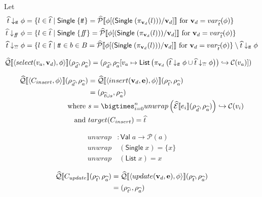 Let
\begin{align}
    \abstable \downarrow_{\true} \phi &= \{ l \in \ab{t} \mid \mathsf{Single} \; \{ \true \} = \abspredsem{\phi[(\mathsf{Single} \; (\pi_{\mathbf{v}_d}(l)))/\mathbf{v}_d]} \text{ for } \mathbf{v}_d = var_{\ab{t}}(\phi) \} \\
    \abstable \downarrow_{\false} \phi &= \{ l \in \ab{t} \mid \mathsf{Single} \; \{ \false \} = \abspredsem{\phi[(\mathsf{Single} \; (\pi_{\mathbf{v}_d}(l)))/\mathbf{v}_d]} \text{ for } \mathbf{v}_d = var_{\ab{t}}(\phi) \} \\
    \abstable \downarrow_{\unknown} \phi &= \{ l \in \ab{t} \mid \true \in b \in B = \abspredsem{\phi[(\mathsf{Single} \; (\pi_{\mathbf{v}_d}(l)))/\mathbf{v}_d]} \text{ for } \mathbf{v}_d = var_{\ab{t}}(\phi) \} \setminus \abstable \downarrow_{\true} \phi
\end{align}

\begin{align}
    \widehat{\mathcal{Q}}\llbracket \langle select(v_a, \mathbf{v}_d), \phi \rangle \rrbracket(\rho_{\widehat{d}}, \rho_{\widehat{a}})
    &= (\rho_{\widehat{d}}, \rho_{\widehat{a}}[v_a \mapsto \mathsf{List} \left( \pi_{\mathbf{v}_d} \left(\widehat{t} \downarrow_{t\!t} \phi \cup \widehat{t} \downarrow_{?\!?} \phi \right) \right) \hookrightarrow \mathcal{C}(v_a) ])
\end{align}

\begin{align}
    \abssqlsem{\langle C_{insert}, \phi \rangle}(\rho_{\ab{d}}, \rho_{\ab{a}}) & =
    \abssqlsem{\langle insert(\mathbf{v}_d, \mathbf{e}), \phi \rangle}(\rho_{\ab{t}}, \rho_{\ab{a}})\\
    & = (\rho_{\ab{t} \cup s}, \rho_{\ab{a}}) \\
    \text{where }& s = \bigtimes_{i = 0}^{n} unwrap\left( \absexpsem{e_i}(\rho_{\ab{d}}, \rho_{\ab{a}}) \right) \into \lookupcl(v_i) \\
    \text{and }& target(C_{insert}) = \ab{t}
\end{align}

\begin{align}
    unwrap &: \mathsf{Val} \; a  \rightarrow \mathcal{P}(a) \\
    unwrap &\;(\mathsf{Single} \; x) = \{x\} \\
    unwrap &\;(\mathsf{List} \; x) = x
\end{align}


\begin{align}
    \widehat{\mathcal{Q}}\llbracket C_{update} \rrbracket(\rho_{\widehat{t}}, \rho_{\widehat{a}})
                                              & = \widehat{\mathcal{Q}}\llbracket \langle update(\mathbf{v}_d, \mathbf{e}), \phi \rangle \rrbracket (\rho_{\widehat{t}}, \rho_{\widehat{a}}) \\
                                              & = (\rho_{\widehat{t}'}, \rho_{\widehat{a}})
\end{align}


